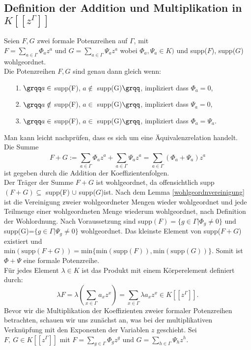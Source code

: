 \subsection{Definition der Addition und Multiplikation in $K[[z^{\Gamma}]]$}
Seien $F, G$ zwei formale Potenzreihen auf $\Gamma$, mit $F = \sum_{a \in \Gamma}^{} \Phi_a z^a \text{ und } G = \sum_{a \in \Gamma}^{} \Psi_a z^a$ wobei $\Phi_a, \Psi_a \in K)$ und supp($F$), supp($G$) wohlgeordnet. \\
Die Potenzreihen $F, G$ sind genau dann gleich wenn:
\begin{enumerate}
\item[1.]$\grqq a \in$ supp(F), $a \notin$ supp(G)$\grqq$, impliziert dass $\Phi_a = 0$,
\item[2.]$\grqq a \notin$ supp(F), $a \in$ supp(G)$\grqq$, impliziert dass $\Psi_a = 0$,
\item[3.]$\grqq a \in$ supp(F), $a \in$ supp(G)$\grqq$, impliziert dass $\Phi_a = \Psi_a$.
\end{enumerate}
Man kann leicht nachprüfen, dass es sich um eine Äquivalenzrelation handelt. \cite{carruth48}\\
Die Summe 
\[F + G := \sum_{a \in \Gamma}^{} \Phi_a z^a + \sum_{a \in \Gamma}^{} \Psi_a z^a = \sum_{a \in \Gamma}^{}\left(\Phi_a + \Psi_a\right)z^a \]
ist gegeben durch die Addition der Koeffizientenfolgen. \\
Der Träger der Summe $F + G$ ist wohlgeordnet, da offensichtlich supp$(F+ G)\subseteq $ supp(F) $\cup$ supp($G$)ist. Nach dem Lemma \ref{wohlgeordnvereinigung} ist die Vereinigung zweier wohlgeordneter Mengen wieder wohlgeordnet und jede Teilmenge einer wohlgeordneten Menge wiederum wohlgeordnet, nach Definition der Wohlordnung. Nach Voraussetzung sind supp$(F) =\lbrace g \in \Gamma| \Phi_{g} \neq 0 \rbrace \text{ und } $supp(G)=$\lbrace g \in \Gamma| \Psi_{g} \neq 0 \rbrace$ wohlgeordnet. Das kleinste Element von supp($F+G$) existiert und $\text{min}\left( \text{supp}\left(F+ G\right)\right) = \text{min}\lbrace \text{min}\left( \text{supp}(F)\right), \text{min}\left( \text{supp}(G)\right) \rbrace $. Somit ist $\Phi + \Psi$ eine formale Potenzreihe. \\
%
Für jedes Element $\lambda \in K$ ist das Produkt mit einem Körperelement definiert durch: \[\lambda F = \lambda (\sum_{x \in \Gamma}^{}a_x z^x) = \sum_{x \in \Gamma}^{}\lambda a_x z^x \in K[[z^{\Gamma}]].\]  
Bevor wir die Multiplikation der Koeffizienten zweier formaler Potenzreihen betrachten, schauen wir uns zunächst an, was bei der multiplikativen Verknüpfung mit den Exponenten der Variablen $z$ geschieht. Sei $F,~ G \in K[[z^{\Gamma}]]$ mit $ F = \sum_{g \in \Gamma}^{} \Phi_g z^g \text{ und } G = \sum_{h \in \Gamma}^{} \Psi_h z^h $. \\

